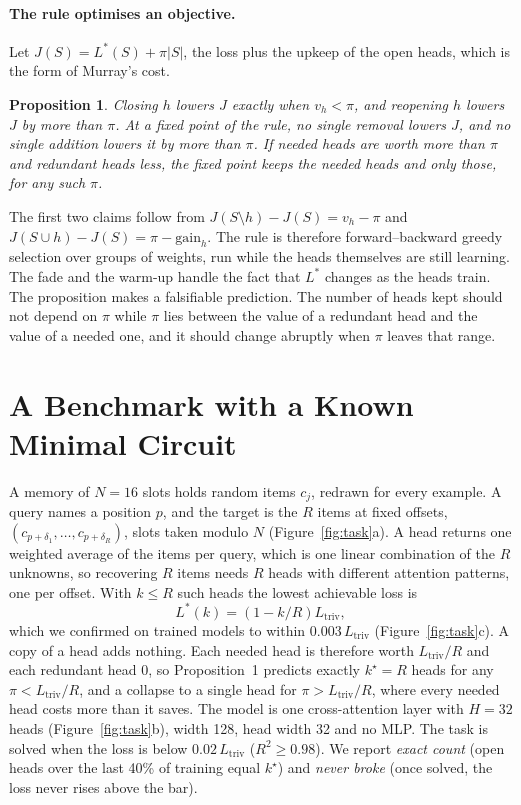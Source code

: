 \documentclass[letterpaper]{article} %
\newtheorem{proposition}{Proposition}
\newcommand{\Ltriv}{L_{\mathrm{triv}}}
\newcommand{\kstar}{k^\star}
\begin{document}
\paragraph{The rule optimises an objective.} Let $J(S)=L^\ast(S)+\pi|S|$, the loss plus the upkeep of the open heads, which is the form of Murray's cost.
\begin{proposition}
Closing $h$ lowers $J$ exactly when $v_h<\pi$, and reopening $h$ lowers $J$ by more than $\pi$. At a fixed point of the rule, no single removal lowers $J$, and no single addition lowers it by more than $\pi$. If needed heads are worth more than $\pi$ and redundant heads less, the fixed point keeps the needed heads and only those, for any such $\pi$.
\end{proposition}
The first two claims follow from $J(S\setminus h)-J(S)=v_h-\pi$ and $J(S\cup h)-J(S)=\pi-\mathrm{gain}_h$. The rule is therefore forward--backward greedy selection \citep{zhang2011foba} over groups of weights, run while the heads themselves are still learning. The fade and the warm-up handle the fact that $L^\ast$ changes as the heads train. The proposition makes a falsifiable prediction. The number of heads kept should not depend on $\pi$ while $\pi$ lies between the value of a redundant head and the value of a needed one, and it should change abruptly when $\pi$ leaves that range.

\section{A Benchmark with a Known Minimal Circuit}


A memory of $N=16$ slots holds random items $c_j$, redrawn for every example. A query names a position $p$, and the target is the $R$ items at fixed offsets, $(c_{p+\delta_1},\dots,c_{p+\delta_R})$, slots taken modulo $N$ (Figure~\ref{fig:task}a). A head returns one weighted average of the items per query, which is one linear combination of the $R$ unknowns, so recovering $R$ items needs $R$ heads with different attention patterns, one per offset. With $k\le R$ such heads the lowest achievable loss is
\begin{equation}
L^\ast(k)=\left(1-k/R\right)\Ltriv ,
\label{eq:law}
\end{equation}
which we confirmed on trained models to within $0.003\,\Ltriv$ (Figure~\ref{fig:task}c). A copy of a head adds nothing. Each needed head is therefore worth $\Ltriv/R$ and each redundant head $0$, so Proposition~1 predicts exactly $\kstar=R$ heads for any $\pi<\Ltriv/R$, and a collapse to a single head for $\pi>\Ltriv/R$, where every needed head costs more than it saves. The model is one cross-attention layer with $H=32$ heads (Figure~\ref{fig:task}b), width 128, head width 32 and no MLP. The task is solved when the loss is below $0.02\,\Ltriv$ ($R^2\ge0.98$). We report \emph{exact count} (open heads over the last 40\% of training equal $\kstar$) and \emph{never broke} (once solved, the loss never rises above the bar).
\end{document}
